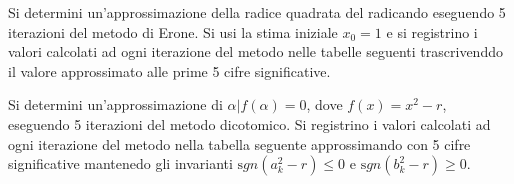 \documentclass[10pt,a4paper,addpoints%
]{exam}
\begin{document}
\begin{questions}
 \begin{question}
  Si determini un'approssimazione della radice quadrata del radicando eseguendo 5 iterazioni
  del metodo di Erone.
  Si usi la stima iniziale $x_0 = 1$ e si registrino i valori calcolati ad ogni iterazione del metodo
   nelle tabelle seguenti trascrivenddo il valore approssimato alle prime 5 cifre significative.
 \end{question}

 \begin{question}
  Si determini un'approssimazione di $\alpha | f(\alpha) = 0$, dove $f(x) = x^2 - r$, eseguendo 5 iterazioni del metodo dicotomico.
  Si registrino i valori calcolati ad ogni iterazione del metodo nella tabella seguente approssimando con
  5 cifre significative mantenedo gli invarianti ${\mathrm sgn} (a_k^2 - r) \leq 0$ e
  ${\mathrm sgn} (b_k^2 - r) \geq 0$.
 \end{question}

\end{questions}



\end{document}
